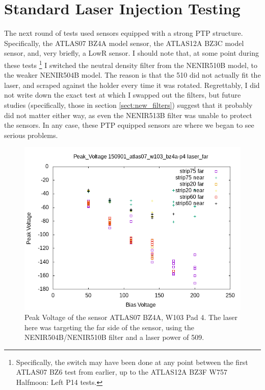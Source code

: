 \documentclass{report}
\begin{document}
        \section{Standard Laser Injection Testing} \label{sect:std_tests}
            The next round of tests used sensors equipped with a strong PTP structure. Specifically, the ATLAS07 BZ4A model sensor, the ATLAS12A BZ3C model sensor, and, very briefly, a LowR sensor. I should note that, at some point during these tests \footnote{Specifically, the switch may have been done at any point between the first ATLAS07 BZ6 test from earlier, up to the ATLAS12A BZ3F W757 Halfmoon: Left P14 tests.} I switched the neutral density filter from the NENIR510B model, to the weaker NENIR504B model. The reason is that the 510 did not actually fit the laser, and scraped against the holder every time it was rotated. Regrettably, I did not write down the exact test at which I swapped out the filters, but future studies (specifically, those in section \ref{sect:new_filters}) suggest that it probably did not matter either way, as even the NENIR513B filter was unable to protect the sensors. In any case, these PTP equipped sensors are where we began to see serious problems.

            \begin{figure}[h] 
                \includegraphics[height=.4\textheight]{Peak_Voltage__150901_atlas07_w103_bz4a-p4__laser_far}
                \centering
                \caption{ Peak Voltage of the sensor ATLAS07 BZ4A, W103 Pad 4. The laser here was targeting the far side of the sensor, using the NENIR504B/NENIR510B filter and a laser power of 509. }
                \label{fig:Peak_Voltage__150901_atlas07_w103_bz4a-p4__laser_far}
            \end{figure}
\end{document}
